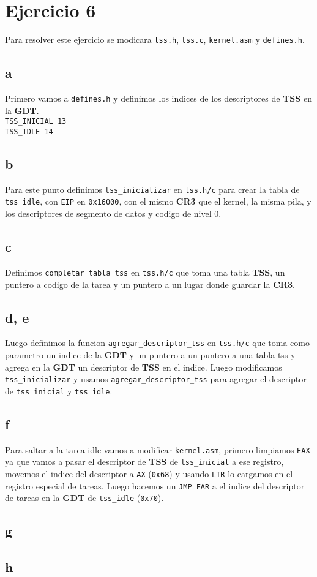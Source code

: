 \section{Ejercicio 6}

Para resolver este ejercicio se modicara \texttt{tss.h}, \texttt{tss.c}, \texttt{kernel.asm} y \texttt{defines.h}.

\subsection{a}
Primero vamos a \texttt{defines.h} y definimos los indices de los descriptores de \textbf{TSS} en la \textbf{GDT}. \\
\texttt{TSS\_INICIAL	13} \\
\texttt{TSS\_IDLE		14} \\

\subsection{b}
Para este punto definimos \texttt{tss\_inicializar} en \texttt{tss.h/c} para crear la tabla de \texttt{tss\_idle}, con \texttt{EIP} en \texttt{0x16000}, con el mismo \textbf{CR3} que el kernel, la misma pila, y los descriptores de segmento de datos y codigo de nivel 0.

\subsection{c}
Definimos \texttt{completar\_tabla\_tss} en \texttt{tss.h/c} que toma una tabla \textbf{TSS}, un puntero a codigo de la tarea y un puntero a un lugar donde guardar la \textbf{CR3}.

\subsection{d, e}
Luego definimos la funcion \texttt{agregar\_descriptor\_tss} en \texttt{tss.h/c} que toma como parametro un indice de la \textbf{GDT} y un puntero a un puntero a una tabla tss y agrega en la \textbf{GDT} un descriptor de \textbf{TSS} en el indice.
Luego modificamos \texttt{tss\_inicializar} y usamos \texttt{agregar\_descriptor\_tss} para agregar el descriptor de \texttt{tss\_inicial} y \texttt{tss\_idle}.

\subsection{f}
Para saltar a la tarea idle vamos a modificar \texttt{kernel.asm}, primero limpiamos \texttt{EAX} ya que vamos a pasar el descriptor de \textbf{TSS} de \texttt{tss\_inicial} a ese registro, movemos el indice del descriptor a \texttt{AX} (\texttt{0x68}) y usando \texttt{LTR} lo cargamos en el registro especial de tareas. Luego hacemos un \texttt{JMP FAR} a el indice del descriptor de tareas en la \textbf{GDT} de \texttt{tss\_idle} (\texttt{0x70}).

\subsection{g}


\subsection{h}
